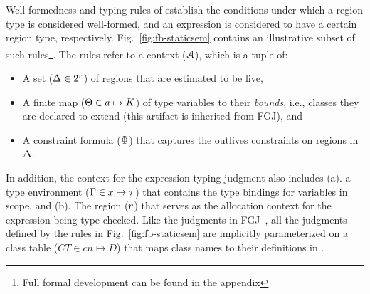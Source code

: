 Well-formedness and typing rules of \fbname establish the conditions
under which a region type is considered well-formed, and an expression
is considered to have a certain region type, respectively.
Fig.~\ref{fig:fb-staticsem} contains an illustrative subset of such
rules\footnote{Full formal development can be found in the
appendix}. The rules refer to a context (${\mathcal{A}}$), which is a tuple of:
\begin{itemize}
\item A set ($\Delta \in 2^r$) of regions that are estimated to be
live,
\item A finite map ($\Theta \in a \mapsto K$) of type
variables to their \emph{bounds}, i.e., classes they are declared to
extend (this artifact is inherited from FGJ), and
\item A constraint formula ($\Phi$) that captures the outlives
constraints on regions in $\Delta$.
\end{itemize}
In addition, the context for the expression typing judgment also
includes (a). a type environment ($\Gamma \in x \mapsto \tau$) that
contains the type bindings for variables in scope, and (b). The region
($r$) that serves as the allocation context for the expression
being type checked. Like the judgments in FGJ~\cite{fgj}, all the
judgments defined by the rules in Fig.~\ref{fig:fb-staticsem} are
implicitly parameterized on a class table ($CT \in cn \mapsto D$) that
maps class names to their definitions in \FB.


